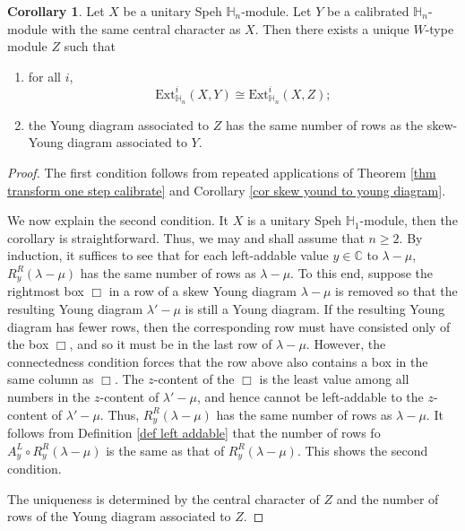 \documentclass[11pt]{amsart}
\numberwithin{equation}{section}
\theoremstyle{definition}
\newtheorem{corollary}[thm]{Corollary}
\begin{document}
\begin{corollary} \label{cor transfer thm}
Let $X$ be a unitary Speh $\mathbb H_n$-module. Let $Y$ be a calibrated $\mathbb H_n$-module with the same central character as $X$. Then there exists a unique $W$-type module $Z$ such that 
\begin{enumerate}
\item[(i)] for all $i$,
\[  \mathrm{Ext}^i_{\mathbb H_n}(X, Y) \cong \mathrm{Ext}^i_{\mathbb H_n}(X, Z) ;
\]
\item[(ii)] the Young diagram associated to $Z$ has the same number of rows as the skew-Young diagram associated to $Y$.
\end{enumerate}

\end{corollary}


\begin{proof}
The first condition follows from repeated applications of Theorem \ref{thm transform one step calibrate} and Corollary \ref{cor skew yound to young diagram}. 

We now explain the second condition. It \(X\) is a unitary Speh \(\mathbb H_1\)-module, then the corollary is straightforward. Thus, we may and shall assume that \(n \geq 2\). By induction, it suffices to see that for each left-addable value \(y \in \mathbb C\) to \(\lambda-\mu\), \(R^R_y(\lambda-\mu)\) has the same number of rows as \(\lambda-\mu\). To this end, suppose the rightmost box $\Box$ in a row of a skew Young diagram $\lambda-\mu$ is removed so that the resulting Young diagram $\lambda'-\mu$ is still a Young diagram. If the resulting Young diagram has fewer rows, then the corresponding row must have consisted only of the box $\Box$, and so it must be in the last row of \(\lambda-\mu\). However, the connectedness condition forces that the row above also contains a box in the same column as \(\Box\). The $z$-content of the $\Box$ is the least value among all numbers in the $z$-content of $\lambda'-\mu$, and hence cannot be left-addable to the  $z$-content of $\lambda'-\mu$. Thus, \(R^R_y(\lambda-\mu)\) has the same number of rows as \(\lambda-\mu\). It follows from Definition \ref{def left addable} that the number of rows fo \(A^L_y\circ R^R_y(\lambda-\mu)\) is the same as that of \(R^R_y(\lambda-\mu)\). This shows the second condition. 

The uniqueness is determined by the central character of $Z$ and the number of rows of the Young diagram associated to $Z$. 
\end{proof}
\end{document}
